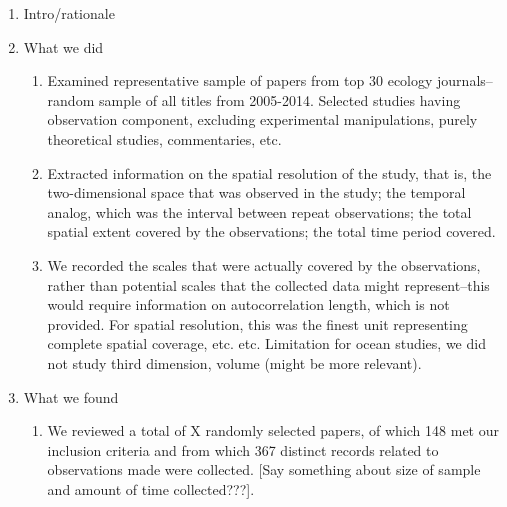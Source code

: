 \documentclass[12pt]{article}
\begin{document}
\begin{enumerate}
 \item Intro/rationale 
   \item{What we did}
   \begin{enumerate}
    \item Examined representative sample of papers from top 30 ecology journals--random sample of all titles from 2005-2014. Selected studies having observation component, excluding experimental manipulations, purely theoretical studies, commentaries, etc. 
    \item Extracted information on the spatial resolution of the study, that is, the two-dimensional space that was observed in the study; the temporal analog, which was the interval between repeat observations; the total spatial extent covered by the observations; the total time period covered. 
    \item We recorded the scales that were actually covered by the observations, rather than potential scales that the collected data might represent--this would require information on autocorrelation length, which is not provided. 
    \subitem For spatial resolution, this was the finest unit representing complete spatial coverage, etc. etc. 
    \subitem Limitation for ocean studies, we did not study third dimension, volume (might be more relevant). 
   \end{enumerate}
   \item{What we found} 
   \begin{enumerate}
    \item We reviewed a total of X randomly selected papers, of which 148 met our inclusion criteria and from which 367 distinct records related to observations made were collected. [Say something about size of sample and amount of time collected???].  

\end{enumerate}
\end{enumerate}
\end{document}
